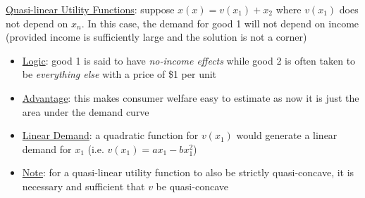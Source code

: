 \documentclass{article}
\begin{document}
  \par
  \underline{Quasi-linear Utility Functions}: suppose $x(x) = v(x_{1}) + x_{2}$ where $v(x_{1})$ does not depend on $x_{n}$. In this case, the demand for good 1 will not depend on income (provided income is sufficiently large and the solution is not a corner)
  \begin{itemize}
    \item  \underline{Logic}: good 1 is said to have \textit{no-income effects} while good 2 is often taken to be \textit{everything else} with a price of \$1 per unit
    \item  \underline{Advantage}: this makes consumer welfare easy to estimate as now it is just the area under the demand curve
    \item  \underline{Linear Demand}: a quadratic function for $v(x_{1})$ would generate a linear demand for $x_{1}$ (i.e. $v(x_{1}) = ax_{1} - bx_{1}^{2}$)
    \item  \underline{Note}: for a quasi-linear utility function to also be strictly quasi-concave, it is necessary and sufficient that $v$ be quasi-concave
  \end{itemize}
  \par
\vspace{6mm}
\end{document}

